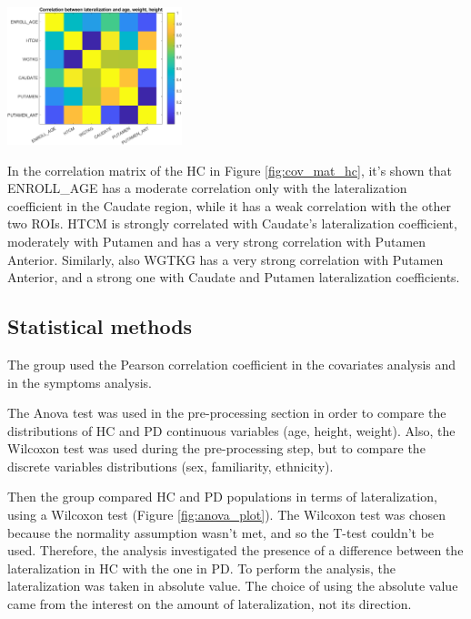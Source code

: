 \documentclass[]{article}
\newenvironment{Figure}
{\par\medskip\noindent\minipage{\linewidth}}
{\endminipage\par\medskip}
\begin{document}
\begin{multicols}{2}
\begin{Figure}
	\centering
	\includegraphics[width=2in]{../covariates_mat_hc}
	\label{fig:cov_mat_hc}

\end{Figure}
 
In the correlation matrix of the HC in Figure \ref{fig:cov_mat_hc}, it's shown that ENROLL\_AGE has a moderate correlation only with the lateralization coefficient in the Caudate region, while it has a weak correlation with the other two ROIs. HTCM is strongly correlated with Caudate's lateralization coefficient, moderately with Putamen and has a very strong correlation with Putamen Anterior. Similarly, also WGTKG has a very strong correlation with Putamen Anterior, and a strong one with Caudate and Putamen lateralization coefficients.

\subsection{Statistical methods}

The group used the Pearson correlation coefficient in the covariates analysis and in the symptoms analysis.

The Anova test was used in the pre-processing section in order to compare the distributions of HC and PD continuous variables (age, height, weight).
Also, the Wilcoxon test was used during the pre-processing step, but to compare the discrete variables distributions (sex, familiarity, ethnicity).

Then the group compared HC and PD populations in terms of lateralization, using a Wilcoxon test (Figure \ref{fig:anova_plot}). The Wilcoxon test was chosen because the normality assumption wasn't met, and so the T-test couldn't be used.
Therefore, the analysis investigated the presence of a difference between the lateralization in HC with the one in PD. To perform the analysis, the lateralization was taken in absolute value. The choice of using the absolute value came from the interest on the amount of lateralization, not its direction.


\end{multicols}
\end{document}
